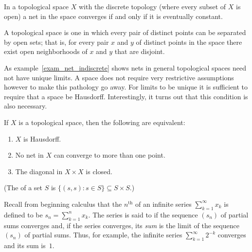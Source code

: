 \begin{exam} In a topological space $X$ with the discrete topology (where every subset of $X$ is open) a net
in the space  converges if and only if it is eventually constant.
 \end{exam}

\begin{defn} A
 topological space is one in which every pair of distinct points can be
separated by open sets; that is, for every pair $x$ and $y$ of distinct points in the space there exist
open neighborhoods of $x$ and $y$ that are disjoint.
\end{defn}

As example~\ref{exam_net_indiscrete} shows nets in general topological spaces need not have unique
limits. A space does not require very restrictive assumptions however to make this
pathology go away. For limits to be unique it is sufficient to require that a space be
Hausdorff. Interestingly, it turns out that this condition is also necessary.

\begin{prop}\label{C031441} If $X$ is a topological space, then the following are equivalent:
 \begin{enumerate}
  \item $X$ is Hausdorff.
  \item No net in $X$ can converge to more than one point.
  \item The diagonal in $X \times X$ is closed.
 \end{enumerate}
\end{prop}
(The
 of a set $S$ is $\{(s,s) \colon s \in S\} \subseteq S \times S$.)

\begin{exam} Recall from beginning calculus that the $n^{\text{th}}$
 of an infinite series $\sum_{k=1}^\infty x_k$ is defined to be $s_n =
\sum_{k=1}^n x_k$.  The series is said to
 if the sequence $(s_n)$ of partial sums converges and, if the series
converges, its
\emph{sum} is the limit of the sequence $(s_n)$ of partial sums.  Thus, for example, the
infinite series $\sum_{k=1}^\infty 2^{-k}$ converges and its sum is~$1$.
\end{exam}


